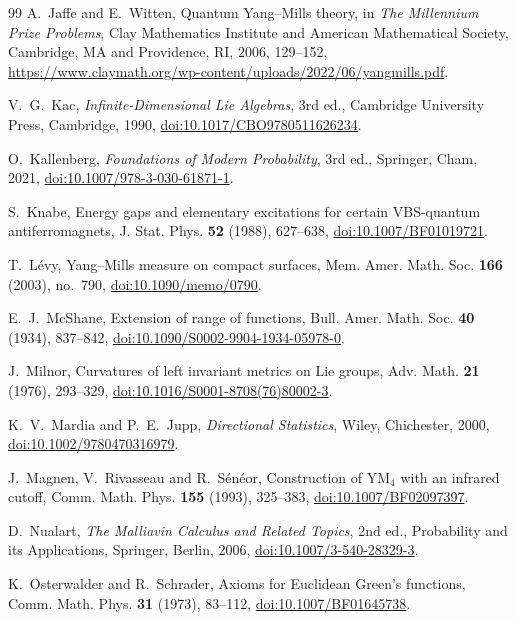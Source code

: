 \begin{thebibliography}{99}
A.~Jaffe and E.~Witten, Quantum Yang--Mills theory, in \emph{The Millennium
Prize Problems}, Clay Mathematics Institute and American Mathematical
Society, Cambridge, MA and Providence, RI, 2006, 129--152,
\url{https://www.claymath.org/wp-content/uploads/2022/06/yangmills.pdf}.

V.~G.~Kac, \emph{Infinite-Dimensional Lie Algebras}, 3rd ed., Cambridge University Press, Cambridge, 1990, \href{https://doi.org/10.1017/CBO9780511626234}{doi:10.1017/CBO9780511626234}.

O.~Kallenberg, \emph{Foundations of Modern Probability}, 3rd ed., Springer,
Cham, 2021, \href{https://doi.org/10.1007/978-3-030-61871-1}{doi:10.1007/978-3-030-61871-1}.

S.~Knabe, Energy gaps and elementary excitations for certain VBS-quantum antiferromagnets, J. Stat. Phys. \textbf{52} (1988), 627--638, \href{https://doi.org/10.1007/BF01019721}{doi:10.1007/BF01019721}.

T.~L\'evy, Yang--Mills measure on compact surfaces, Mem. Amer. Math. Soc. \textbf{166} (2003), no.~790, \href{https://doi.org/10.1090/memo/0790}{doi:10.1090/memo/0790}.

E.~J.~McShane, Extension of range of functions, Bull. Amer. Math. Soc. \textbf{40} (1934), 837--842, \href{https://doi.org/10.1090/S0002-9904-1934-05978-0}{doi:10.1090/S0002-9904-1934-05978-0}.

J.~Milnor, Curvatures of left invariant metrics on Lie groups, Adv.
Math. \textbf{21} (1976), 293--329,
\href{https://doi.org/10.1016/S0001-8708(76)80002-3}{doi:10.1016/S0001-8708(76)80002-3}.

K.~V.~Mardia and P.~E.~Jupp, \emph{Directional Statistics}, Wiley, Chichester, 2000, \href{https://doi.org/10.1002/9780470316979}{doi:10.1002/9780470316979}.

J.~Magnen, V.~Rivasseau and R.~S\'en\'eor, Construction of YM$_4$ with an infrared cutoff, Comm. Math. Phys. \textbf{155} (1993), 325--383, \href{https://doi.org/10.1007/BF02097397}{doi:10.1007/BF02097397}.

D.~Nualart, \emph{The Malliavin Calculus and Related Topics}, 2nd ed., Probability and its Applications, Springer, Berlin, 2006, \href{https://doi.org/10.1007/3-540-28329-3}{doi:10.1007/3-540-28329-3}.

K.~Osterwalder and R.~Schrader, Axioms for Euclidean Green's functions,
Comm. Math. Phys. \textbf{31} (1973), 83--112,
\href{https://doi.org/10.1007/BF01645738}{doi:10.1007/BF01645738}.


\end{thebibliography}
